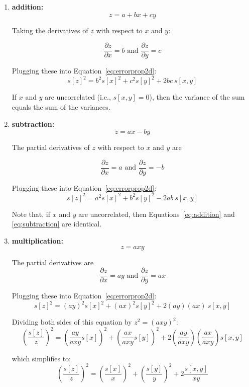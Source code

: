 \begin{enumerate}
  
\item{\bf addition:}
  \[
  z = a + b x + c y
  \]

  Taking the derivatives of $z$ with respect to $x$ and $y$:
  
  \[
  \frac{\partial z}{\partial x} = b \mbox{~and~} \frac{\partial z}{\partial y} = c
  \]

  Plugging these into Equation~\ref{eq:errorprop2d}:
  \begin{equation}
    s[z]^2 = b^2 s[x]^2 + c^2 s[y]^2 + 2bc~s[x,y]
    \label{eq:addition}
  \end{equation}

  If $x$ and $y$ are uncorrelated (i.e., $s[x,y]=0$), then the
  variance of the sum equals the sum of the variances.

\item{\bf subtraction:}
  \[
  z = a x - b y
  \]

  The partial derivatives of $z$ with respect to $x$ and $y$ are

  \[
  \frac{\partial z}{\partial x} = a \mbox{~and~}
  \frac{\partial z}{\partial y} = -b
  \]

  Plugging these into Equation~\ref{eq:errorprop2d}:
  \begin{equation}
    s[z]^2 = a^2 s[x]^2 + b^2 s[y]^2 - 2ab~s[x,y]
    \label{eq:subtraction}
  \end{equation}

  Note that, if $x$ and $y$ are uncorrelated, then
  Equations~\ref{eq:addition} and \ref{eq:subtraction} are identical.

\item{\bf multiplication:}
  \[
  z = a x y
  \]

  The partial derivatives are
  \[
  \frac{\partial z}{\partial x} = a y \mbox{~and~}
  \frac{\partial z}{\partial y} = a x
  \]

  Plugging these into Equation~\ref{eq:errorprop2d}:
  \[
  s[z]^2 = (a y)^2 s[x]^2 + (a x)^2 s[y]^2 + 2(a y)(a x)~s[x,y]
  \]

  Dividing both sides of this equation by $z^2 = (a x y)^2$:
  \[
  \left(\frac{s[z]}{z}\right)^2 =
  \left(\frac{a y}{a x y} s[x]\right)^2 +
  \left(\frac{a x}{a x y} s[y]\right)^2 +
  2\left(\frac{a y}{a x y}\right)\left(\frac{a x}{a x y}\right) s[x,y]
  \]

  which simplifies to:
  \begin{equation}
    \left(\frac{s[z]}{z}\right)^2 = \left(\frac{s[x]}{x}\right)^2 +
    \left(\frac{s[y]}{y}\right)^2 + 2 \frac{s[x,y]}{x y}
    \label{eq:multiplication}
  \end{equation}


\end{enumerate}
